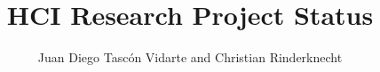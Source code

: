 \documentclass[11pt,oneside,a4paper]{article}
\begin{document}
\title{HCI Research Project Status}
\author{Juan Diego Tascón Vidarte and Christian Rinderknecht}
\maketitle





\end{document}

